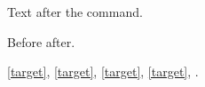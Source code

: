 Text after the command.


Before \unknown[option] after.

\emph{}

\ref{target}, \ref*{target}, \eqref{target}, \autoref{target}, \pageref{target}.
